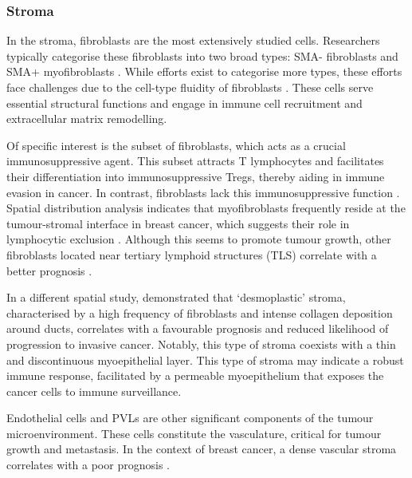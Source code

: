 \subsubsection*{Stroma}

In the stroma, fibroblasts are the most extensively studied cells. Researchers typically categorise these fibroblasts into two broad types: SMA- fibroblasts and SMA+ myofibroblasts \parencite{Costa2018-ir}. While efforts exist to categorise more types, these efforts face challenges due to the cell-type fluidity of fibroblasts \parencite{Cords2023-og,Wu2021-uq}. These cells serve essential structural functions and engage in immune cell recruitment and extracellular matrix remodelling.

Of specific interest is the   subset of fibroblasts, which acts as a crucial immunosuppressive agent. This subset attracts T lymphocytes and facilitates their differentiation into immunosuppressive Tregs, thereby aiding in immune evasion in cancer. In contrast,   fibroblasts lack this immunosuppressive function \parencite{Costa2018-ir}. Spatial distribution analysis indicates that myofibroblasts frequently reside at the tumour-stromal interface in breast cancer, which suggests their role in lymphocytic exclusion \parencite{Danenberg2022-zb}. Although this seems to promote tumour growth, other fibroblasts located near tertiary lymphoid structures (TLS) correlate with a better prognosis \parencite{Danenberg2022-zb, Cords2023-og} . 

In a different spatial study, \textcite{Risom2022-uw} demonstrated that `desmoplastic' stroma, characterised by a high frequency of fibroblasts and intense collagen deposition around ducts, correlates with a favourable prognosis and reduced likelihood of progression to invasive cancer. Notably, this type of stroma coexists with a thin and discontinuous myoepithelial layer. This type of stroma may indicate a robust immune response, facilitated by a permeable myoepithelium that exposes the cancer cells to immune surveillance.

Endothelial cells and \acp{PVL} are other significant components of the tumour microenvironment. These cells constitute the vasculature, critical for tumour growth and metastasis. In the context of breast cancer, a dense vascular stroma correlates with a poor prognosis \parencite{Danenberg2022-zb}.

